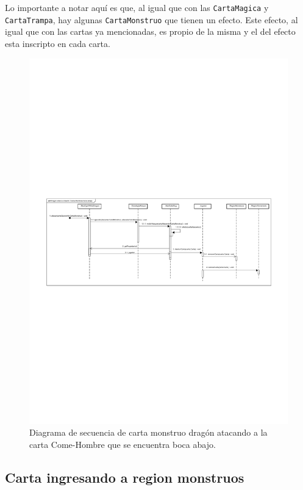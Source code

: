 	Lo importante a notar aquí es que, al igual que con las \texttt{CartaMagica} y \texttt{CartaTrampa}, hay algunas \texttt{CartaMonstruo} que tienen un efecto. Este efecto, al igual que con las cartas ya mencionadas, es propio de la misma y el  del efecto esta inscripto en cada carta.
	
	\begin{figure}[H]
		\centering
		\includegraphics[scale=0.9]{includes/seq_Dragon_ataca_a_insecto_Come_Hombres_boca_abajo}
		\caption{Diagrama de secuencia de carta monstruo dragón atacando a la carta Come-Hombre que se encuentra boca abajo.}
		\label{seq_Dragon_ataca_a_insecto_Come_Hombres_boca_abajo}
	\end{figure}
	
	\subsection{Carta ingresando a region monstruos}
	
